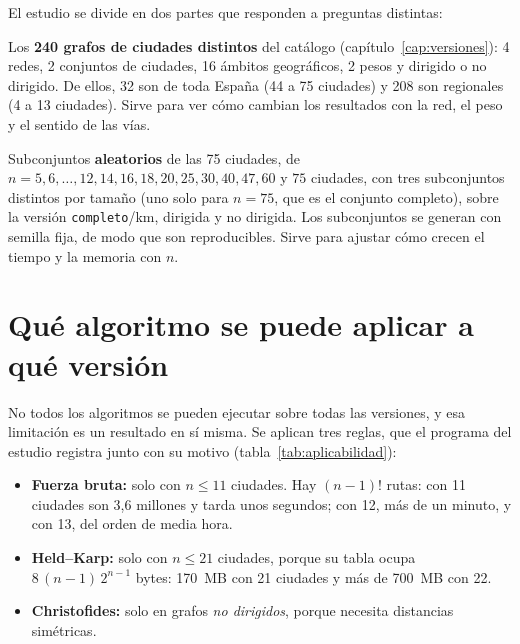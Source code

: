 El estudio se divide en dos partes que responden a preguntas distintas:
\begin{description}[leftmargin=0pt,labelindent=0pt,style=nextline]
  \item[Estudio A: versiones reales.] Los \textbf{240 grafos de ciudades distintos} del catálogo (capítulo~\ref{cap:versiones}): 4 redes, 2 conjuntos de ciudades, 16 ámbitos geográficos, 2 pesos y dirigido o no dirigido.
        De ellos, 32 son de toda España (44 a 75 ciudades) y 208 son regionales (4 a 13 ciudades). Sirve para ver cómo cambian los resultados con la red, el peso y el sentido de las vías.
  \item[Estudio B: curva de escalado.] Subconjuntos \textbf{aleatorios} de las 75 ciudades, de $n=5,6,\dots,12,14,16,18,20,25,30,40,47,60$ y $75$ ciudades, con tres subconjuntos distintos por tamaño (uno solo para $n=75$, que es el conjunto completo),
        sobre la versión \texttt{completo}/km, dirigida y no dirigida. Los subconjuntos se generan con semilla fija, de modo que son reproducibles. Sirve para ajustar cómo crecen el tiempo y la memoria con $n$.
\end{description}

\section{Qué algoritmo se puede aplicar a qué versión}\label{sec:aplicabilidad}

No todos los algoritmos se pueden ejecutar sobre todas las versiones, y esa limitación es un resultado en sí misma. Se aplican tres reglas, que el programa del estudio registra junto con su motivo (tabla~\ref{tab:aplicabilidad}):
\begin{itemize}
  \item \textbf{Fuerza bruta:} solo con $n\le 11$ ciudades. Hay $(n-1)!$ rutas: con 11 ciudades son 3,6 millones y tarda unos segundos; con 12, más de un minuto, y con 13, del orden de media hora.
  \item \textbf{Held--Karp:} solo con $n\le 21$ ciudades, porque su tabla ocupa $8\,(n-1)\,2^{n-1}$ bytes: 170~MB con 21 ciudades y más de 700~MB con 22.
  \item \textbf{Christofides:} solo en grafos \emph{no dirigidos}, porque necesita distancias simétricas.
\end{itemize}

